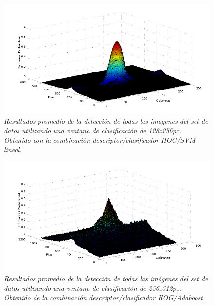 \begin{figure}[H]
  \centering
  \includegraphics[scale=.6]{images/mean/svm/128}
  \caption{\em  Resultados promedio de la detección de todas las imágenes del set de datos utilizando una ventana de clasificación de 128x256px. Obtenido con la combinación descriptor/clasificador HOG/SVM lineal.}  
  \label{fig:gp6}
\end{figure}

\begin{figure}[H]
  \centering
  \includegraphics[scale=.6]{images/mean/boost/256}
  \caption{\em  Resultados promedio de la detección de todas las imágenes del set de datos utilizando una ventana de clasificación de 256x512px. Obtenido de la combinación descriptor/clasificador HOG/Adaboost.}  
  \label{fig:gp7}
\end{figure}

